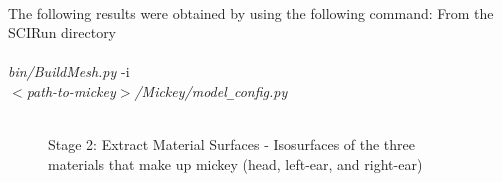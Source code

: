 \documentclass[fleqn,12pt,openany]{book}
\begin{document}
\paragraph{}
The following results were obtained by using the following command:
From the SCIRun directory \\ \\
\emph{bin/BuildMesh.py} -i \\ \emph{$<$path-to-mickey$>$/Mickey/model}\verb+_+\emph{config.py}  \\ \\
\begin{figure}[h!]
\begin{center}
\end{center}
\caption{\label{fig:MickeySurf} Stage 2: Extract Material Surfaces - Isosurfaces of the three materials that make up mickey (head, left-ear, and right-ear)}
\end{figure} 
\end{document}
